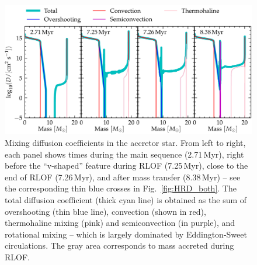 \documentclass[twocolumn,twocolappendix,trackchanges]{aastex63}
\DeclareRobustCommand{\Figref}[1]{Fig.~\ref{#1}}
\begin{document}
\begin{figure}[htbp]
  \includegraphics[width=\textwidth]{D_mix}
  \caption{Mixing diffusion coefficients in the accretor star. From
    left to right, each panel shows times during the main sequence
    (2.71\,Myr), right before the ``v-shaped'' feature during RLOF
    (7.25\,Myr), close to the end of RLOF (7.26\,Myr), and after mass
    transfer (8.38\,Myr) -- see the corresponding thin blue crosses in
    \Figref{fig:HRD_both}. The total diffusion coefficient (thick cyan
    line) is obtained as the sum of overshooting (thin blue line),
    convection (shown in red), thermohaline mixing (pink) and
    semiconvection (in purple), and rotational mixing -- which is
    largely dominated by Eddington-Sweet circulations. The gray area corresponds to mass
    accreted during
    RLOF.}
  \label{fig:D_mix}
\end{figure}
\end{document}
